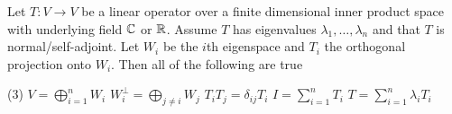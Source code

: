 \documentclass{subfiles}
\begin{document}
\begin{theorem}
    \label{thm:spectralthm}
    Let $T : V \to V$ be a linear operator over a finite dimensional inner product space with underlying field $\mathbb{C}$ or $\mathbb{R}$. Assume $T$ has eigenvalues $\lambda_1, \ldots, \lambda_n$ and that $T$ is normal/self-adjoint. Let $W_i$ be the $i$th eigenspace and $T_i$ the orthogonal projection onto $W_i$. Then all of the following are true
    \begin{tasks}(3)
        \task $V = \displaystyle\bigoplus_{i=1}^n W_i$
        \task $W_i^\perp = \displaystyle\bigoplus_{j\neq i} W_j$
        \task $T_i T_j = \displaystyle\delta_{ij} T_i$
        \task $I = \displaystyle\sum_{i=1}^n T_i$
        \task $T = \displaystyle\sum_{i=1}^n \lambda_i T_i$
    \end{tasks}
\end{theorem}
\end{document}
